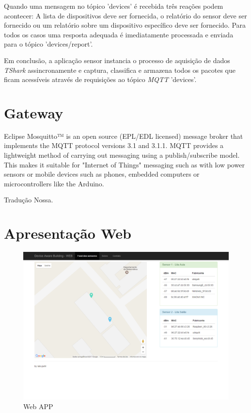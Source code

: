 Quando uma mensagem no tópico 'devices' é recebida três reações podem acontecer:
A lista de dispositivos deve ser fornecida, o relatório do sensor deve ser
fornecido ou um relatório sobre um dispositivo específico deve ser fornecido.
Para todos os casos uma resposta adequada é imediatamente processada e enviada
para o tópico 'devices/report'.

Em conclusão, a aplicação sensor instancia o processo de aquisição de dados
\emph{TShark} assincronamente e captura, classifica e armazena todos os pacotes
que ficam acessíveis através de requisições ao tópico \emph{MQTT} 'devices'.


\section{Gateway}
\label{sec:app-gw}

\begin{citacao}

	Eclipse Mosquitto™ is an open source (EPL/EDL licensed) message broker that
	implements the MQTT protocol versions 3.1 and 3.1.1. MQTT provides a lightweight
	method of carrying out messaging using a publish/subscribe model. This makes it
	suitable for "Internet of Things" messaging such as with low power sensors or
	mobile devices such as phones, embedded computers or microcontrollers like the
	Arduino. \

	 Tradução Nossa.
\end{citacao}


\section{Apresentação Web}
\label{sec:app-web}


\begin{figure}[htb]
	\caption{\label{fig-web-app}Web APP}
	\begin{center}
		\includegraphics[width=1\textwidth]{050-construcao/web-app.png}
	\end{center}
\end{figure}
